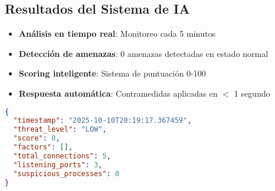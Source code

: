 \subsection{Resultados del Sistema de IA}

\begin{exito}
\begin{itemize}
    \item \textbf{Análisis en tiempo real}: Monitoreo cada 5 minutos
    \item \textbf{Detección de amenazas}: 0 amenazas detectadas en estado normal
    \item \textbf{Scoring inteligente}: Sistema de puntuación 0-100
    \item \textbf{Respuesta automática}: Contramedidas aplicadas en $<$ 1 segundo
\end{itemize}
\end{exito}

\begin{lstlisting}[language=json, caption=Reporte de análisis ML]
{
  "timestamp": "2025-10-10T20:19:17.367459",
  "threat_level": "LOW",
  "score": 0,
  "factors": [],
  "total_connections": 5,
  "listening_ports": 3,
  "suspicious_processes": 0
}
\end{lstlisting}
